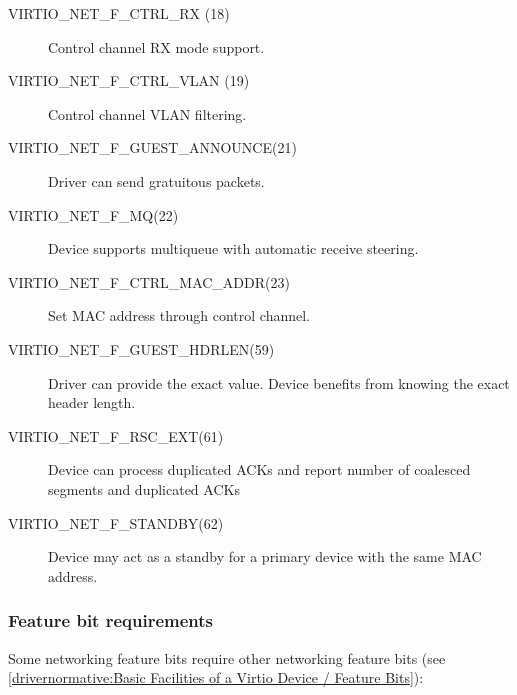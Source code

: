 \begin{description}
\item[VIRTIO_NET_F_CTRL_RX (18)] Control channel RX mode support.

\item[VIRTIO_NET_F_CTRL_VLAN (19)] Control channel VLAN filtering.

\item[VIRTIO_NET_F_GUEST_ANNOUNCE(21)] Driver can send gratuitous
    packets.

\item[VIRTIO_NET_F_MQ(22)] Device supports multiqueue with automatic
    receive steering.

\item[VIRTIO_NET_F_CTRL_MAC_ADDR(23)] Set MAC address through control
    channel.

\item[VIRTIO_NET_F_GUEST_HDRLEN(59)] Driver can provide the exact 
    value. Device benefits from knowing the exact header length.

\item[VIRTIO_NET_F_RSC_EXT(61)] Device can process duplicated ACKs
    and report number of coalesced segments and duplicated ACKs

\item[VIRTIO_NET_F_STANDBY(62)] Device may act as a standby for a primary
    device with the same MAC address.
\end{description}

\subsubsection{Feature bit requirements}\label{sec:Device Types / Network Device / Feature bits / Feature bit requirements}

Some networking feature bits require other networking feature bits
(see \ref{drivernormative:Basic Facilities of a Virtio Device / Feature Bits}):

